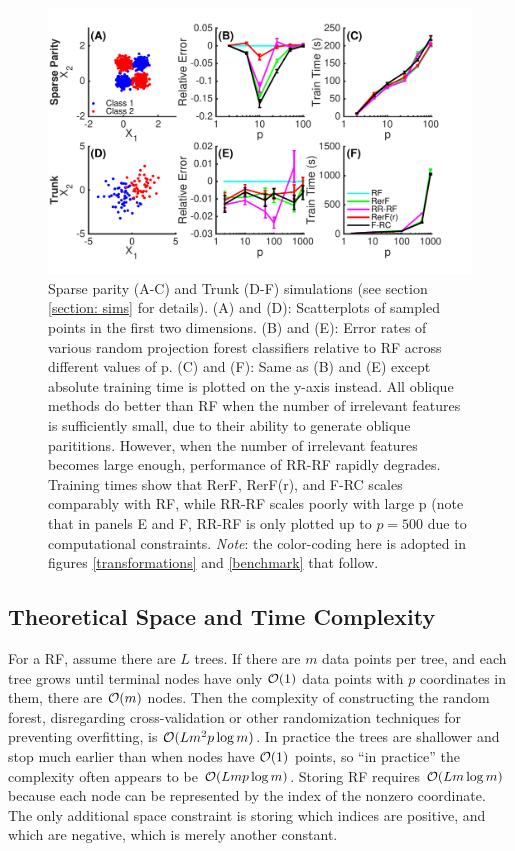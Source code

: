 \begin{figure}[ht]
\vskip 0.2in
\begin{center}
\centerline{\includegraphics[width=\columnwidth]{Fig2_simulations}}
\caption{Sparse parity (A-C) and Trunk (D-F) simulations (see section \ref{section: sims} for details). (A) and (D): Scatterplots of sampled points in the first two dimensions. (B) and (E): Error rates of various random projection forest classifiers relative to RF across different values of p. (C) and (F): Same as (B) and (E) except absolute training time is plotted on the y-axis instead. All oblique methods do better than RF when the number of irrelevant features is sufficiently small, due to their ability to generate oblique parititions. However, when the number of irrelevant features becomes large enough, performance of RR-RF rapidly degrades. Training times show that RerF, RerF(r), and F-RC scales comparably with RF, while RR-RF scales poorly with large p (note that in panels E and F, RR-RF is only plotted up to $p = 500$ due to computational constraints. \emph{Note}: the color-coding here is adopted in figures \ref{transformations} and \ref{benchmark} that follow.}
\label{simulations}
\end{center}
\vskip -0.2in
\end{figure}

\subsection{Theoretical Space and Time Complexity}

For a RF, assume there are $L$ trees. If there are $m$ data points per tree, and each tree grows until terminal nodes have only $\mathcal{O}(1)$ data points with $p$ coordinates in them, there are $\mathcal{O}(m)$ nodes.
Then the complexity of constructing the random forest, disregarding cross-validation or other randomization techniques for preventing overfitting, is $\mathcal{O}(Lm^2p\log m)$. In practice the trees are shallower and stop much earlier than when nodes have $\mathcal{O}(1)$ points, so ``in practice'' the complexity often appears to be $\mathcal{O}(Lmp\log m)$. Storing RF requires $\mathcal{O}(L m\log m)$ because each node can be represented by the index of the nonzero coordinate. The only additional space constraint is storing which indices are positive, and which are negative, which is merely another constant.

